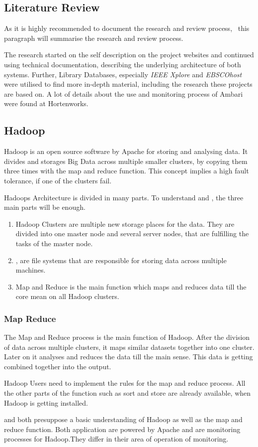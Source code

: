 \subsection{Literature Review}
As it is highly recommended to document the research and review process,~\cite{brocke09} this paragraph will summarise the research and review process.

The research started on the self description on the project websites and continued using technical documentation, describing the underlying architecture of both systems.
Further, Library Databases, especially \emph{IEEE Xplore} and \emph{EBSCOhost} were utilised to find more in-depth material, including the research these projects are based on. A lot of details about the use and monitoring process of Ambari were found at Hortenworks.
	
\subsection{Hadoop}
\label{subsec:Hadoop}
Hadoop is an open source software by Apache for storing and analysing data.\cite{Dagli2014} It divides and storages Big Data across multiple smaller clusters, by copying them three times with the map and reduce function. This concept implies a high fault tolerance, if one of the clusters fail.\cite{Dagli2014}

Hadoops Architecture is divided in many parts. To understand \amb and \chuk, the three main parts will be enough.\cite{Dagli2014}
  \begin{enumerate}
  	\item Hadoop Clusters are multiple new storage places for the data. They are divided into one master node and several server nodes, that are fulfilling the tasks of the master node.\cite{Dagli2014}
  	\item \hdfs, are file systems that are responsible for storing data across multiple machines.\cite{Dagli2014}
  	\item Map and Reduce is the main function which maps and reduces data till the core mean on all Hadoop clusters.\cite{Dagli2014}
  \end{enumerate}

\subsubsection*{Map Reduce}
The Map and Reduce process is the main function of Hadoop. After the division of data across multiple clusters, it maps similar datasets together into one cluster. 
Later on it analyses and reduces the data till the main sense. This data is getting combined together into the output. \cite{Dagli2014}

Hadoop Users need to implement the rules for the map and reduce process. All the other parts of the function such as sort and store are already available, when Hadoop is getting installed.\cite{Dagli2014}


\amb and \chuk both presuppose a basic understanding of Hadoop as well as the map and reduce function. Both application are powered by Apache and are monitoring processes for Hadoop.They differ in their area of operation of monitoring. 